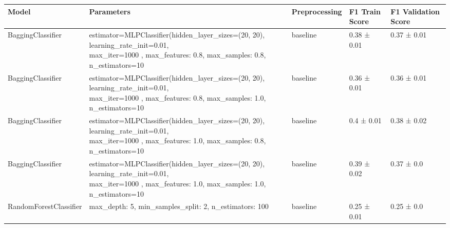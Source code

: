 \begin{tabular}{lllll}
    \toprule
    \textbf{Model}             & \textbf{Parameters}                                                                                                                  & \textbf{Preprocessing} & \textbf{F1 Train Score} & \textbf{F1 Validation Score} \\
    \midrule
    BaggingClassifier          & \makecell{estimator=MLPClassifier(hidden\_layer\_sizes=(20, 20),                                          learning\_rate\_init=0.01,                                                                                   \\                                        max\_iter=1000 , max\_features: 0.8, max\_samples: 0.8, n\_estimators=10\vspace{15pt}} & baseline      & 0.38 ± 0.01    & 0.37 ± 0.01         \\
    BaggingClassifier          & \makecell{estimator=MLPClassifier(hidden\_layer\_sizes=(20, 20),                                          learning\_rate\_init=0.01,                                                                                   \\                                        max\_iter=1000 , max\_features: 0.8, max\_samples: 1.0, n\_estimators=10 \vspace{15pt}} & baseline      & 0.36 ± 0.01    & 0.36 ± 0.01         \\
    BaggingClassifier          & \makecell{estimator=MLPClassifier(hidden\_layer\_sizes=(20, 20),                                          learning\_rate\_init=0.01,                                                                                   \\                                     max\_iter=1000 , max\_features: 1.0, max\_samples: 0.8, n\_estimators=10 \vspace{15pt} }& baseline      & 0.4 ± 0.01     & 0.38 ± 0.02         \\
    BaggingClassifier          & \makecell{estimator=MLPClassifier(hidden\_layer\_sizes=(20, 20),                                          learning\_rate\_init=0.01,                                                                                   \\                                     max\_iter=1000 , max\_features: 1.0, max\_samples: 1.0, n\_estimators=10\vspace{15pt} }& baseline      & 0.39 ± 0.02    & 0.37 ± 0.0          \\
    RandomForestClassifier     & max\_depth: 5, min\_samples\_split: 2, n\_estimators: 100                                                                            & baseline               & 0.25 ± 0.01             & 0.25 ± 0.0                   \\

\end{tabular}
